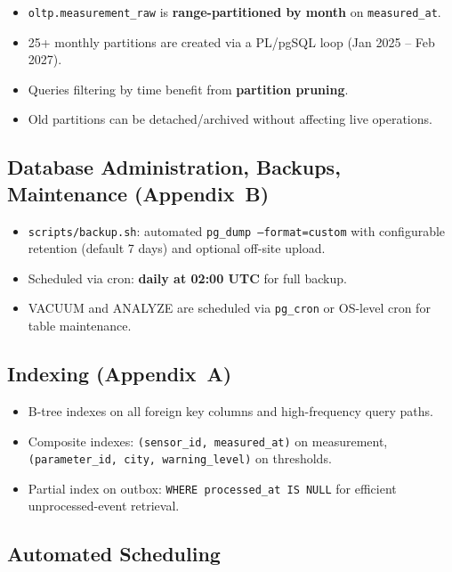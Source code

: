 \documentclass[11pt,a4paper]{article}
\begin{document}
\begin{itemize}[nosep]
  \item \texttt{oltp.measurement\_raw} is \textbf{range-partitioned by month} on \texttt{measured\_at}.
  \item 25+ monthly partitions are created via a PL/pgSQL loop (Jan 2025 -- Feb 2027).
  \item Queries filtering by time benefit from \textbf{partition pruning}.
  \item Old partitions can be detached/archived without affecting live operations.
\end{itemize}

\subsection{Database Administration, Backups, Maintenance (Appendix~B)}

\begin{itemize}[nosep]
  \item \texttt{scripts/backup.sh}: automated \texttt{pg\_dump --format=custom} with configurable retention (default 7 days) and optional off-site upload.
  \item Scheduled via cron: \textbf{daily at 02:00 UTC} for full backup.
  \item VACUUM and ANALYZE are scheduled via \texttt{pg\_cron} or OS-level cron for table maintenance.
\end{itemize}

\subsection{Indexing (Appendix~A)}

\begin{itemize}[nosep]
  \item B-tree indexes on all foreign key columns and high-frequency query paths.
  \item Composite indexes: \texttt{(sensor\_id, measured\_at)} on measurement, \texttt{(parameter\_id, city, warning\_level)} on thresholds.
  \item Partial index on outbox: \texttt{WHERE processed\_at IS NULL} for efficient unprocessed-event retrieval.
\end{itemize}

\subsection{Automated Scheduling}
\end{document}
